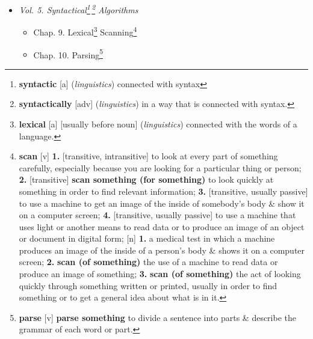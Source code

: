 \documentclass[oneside]{book}
\numberwithin{equation}{section}
\begin{document}
\begin{itemize}
	\begin{itemize}
		\item Chap. 7. Combinatorial Searching
		\item Chap. 8. Recursion\footnote{\textbf{recursion} [n] [uncountable] (\textit{mathematics}) the process of repeating a function, each time applying it to the result of the previous stage.}
	\end{itemize}
	\item \textit{Vol. 5. Syntactical\footnote{\textbf{syntactic} [a] (\textit{linguistics}) connected with syntax}\,\footnote{\textbf{syntactically} [adv] (\textit{linguistics}) in a way that is connected with syntax.} Algorithms}
	\begin{itemize}
		\item Chap. 9. Lexical\footnote{\textbf{lexical} [a] [usually before noun] (\textit{linguistics}) connected with the words of a language.} Scanning\footnote{\textbf{scan} [v] \textbf{1.} [transitive, intransitive] to look at every part of something carefully, especially because you are looking for a particular thing or person; \textbf{2.} [transitive] \textbf{scan something (for something)} to look quickly at something in order to find relevant information; \textbf{3.} [transitive, usually passive] to use a machine to get an image of the inside of somebody's body \& show it on a computer screen; \textbf{4.} [transitive, usually passive] to use a machine that uses light or another means to read data or to produce an image of an object or document in digital form; [n] \textbf{1.} a medical test in which a machine produces an image of the inside of a person's body \& shows it on a computer screen; \textbf{2.} \textbf{scan (of something)} the use of a machine to read data or produce an image of something; \textbf{3.} \textbf{scan (of something)} the act of looking quickly through something written or printed, usually in order to find something or to get a general idea about what is in it.}
		\item Chap. 10. Parsing\footnote{\textbf{parse} [v] \textbf{parse something} to divide a sentence into parts \& describe the grammar of each word or part.}
	\end{itemize}
\end{itemize}
\end{document}
